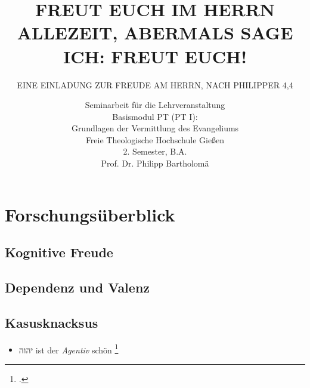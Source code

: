 \documentclass[a4paper,12pt]{scrreprt}
\newcommand{\heb}[1]{\texthebrew{#1}}
\begin{document}
\addtocounter{tocdepth}{1}
\addtocounter{secnumdepth}{1}


\titlehead{ }
\subject{ }
\title{\MakeUppercase{Freut euch im Herrn allezeit, abermals sage ich: Freut euch!}} %
\subtitle{\MakeUppercase {Eine Einladung zur Freude am Herrn, nach Philipper 4,4}}
\author{Seminarbeit für die Lehrveranstaltung\\
Basismodul PT (PT I):\\
Grundlagen der Vermittlung des Evangeliums\\ %
Freie Theologische Hochschule Gießen\\
2. Semester, B.A.\\
Prof. Dr. Philipp Bartholomä}
\date{ } %

\publishers{Florian Kurrle\\ \today} %
\maketitle
\tableofcontents
\pagestyle{headings}


\chapter{\label{Forschung}Forschungsüberblick}
\section{\label{kognitiv}Kognitive Freude}

\section{\label{valenz}Dependenz und Valenz}

\section{\label{case}Kasusknacksus}

\begin{itemize}
\item \heb{יהוה} ist der \textit{Agentiv} schön \footcite[Buch][11ff.]{Alter2011}
\end{itemize}
\end{document}
